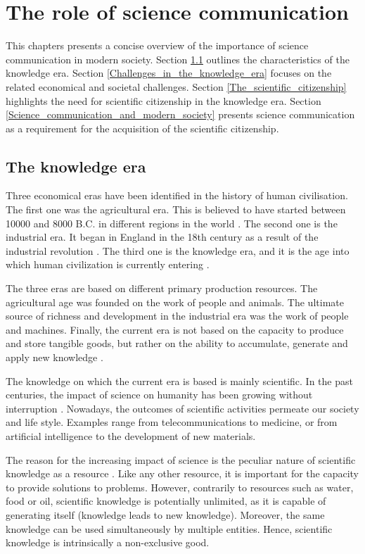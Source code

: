 \chapter{The role of science communication} \label{The_role_of_science_communication}
This chapters presents a concise overview of the importance of science communication in modern society. Section \ref{The_knowledge_era} outlines the characteristics of the knowledge era. Section \ref{Challenges_in_the_knowledge_era} focuses on the related economical and societal challenges. Section \ref{The_scientific_citizenship} highlights the need for scientific citizenship in the knowledge era. Section \ref{Science_communication_and_modern_society} presents science communication as a requirement for the acquisition of the scientific citizenship. 

\section{The knowledge era} \label{The_knowledge_era}
Three economical eras have been identified in the history of human civilisation. The first one was the agricultural era. This is believed to have started between 10000 and 8000 B.C. in different regions in the world \cite{Bocquet,Barker}. The second one is the industrial era. It began in England in the 18th century as a result of the industrial revolution \cite{Trinder, Griffin}. The third one is the knowledge era, and it is the age into which human civilization is currently entering \cite{Bohme-Stehr}. 

The three eras are based on different primary production resources. The agricultural age was founded on the work of people and animals. The ultimate source of richness and development in the industrial era was the work of people and machines. Finally, the current era is not based on the capacity to produce and store tangible goods, but rather on the ability to accumulate, generate and apply new knowledge \cite{Powell}.

The knowledge on which the current era is based is mainly scientific. In the past centuries, the impact of science on humanity has been growing without interruption \cite{Pickstone}. Nowadays, the outcomes of scientific activities permeate our society and life style. Examples range from telecommunications to medicine, or from artificial intelligence to the development of new materials.

The reason for the increasing impact of science is the peculiar nature of scientific knowledge as a resource \cite{Probst}. Like any other resource, it is important for the capacity to provide solutions to problems. However, contrarily to resources such as water, food or oil, scientific knowledge is potentially unlimited, as it is capable of generating itself (knowledge leads to new knowledge). Moreover, the same knowledge can be used simultaneously by multiple entities. Hence, scientific knowledge is intrinsically a non-exclusive good.

